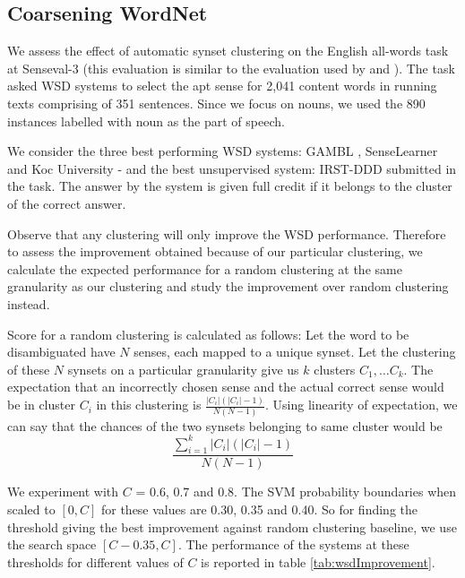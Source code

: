 \subsection{Coarsening WordNet}
We assess the effect of automatic synset clustering on the English all-words task at Senseval-3 \citep{Senseval3AllWordsTask} (this evaluation is similar to the evaluation used by \citep{Navigli06meaningfulclustering} and \citep{snow07mergesense}). The task asked WSD systems to select the apt sense for 2,041 content words in running texts comprising of 351 sentences. Since we focus on nouns, we used the 890 instances labelled with noun as the part of speech.

We consider the three best performing WSD systems: GAMBL \citep{decadt-EtAl:2004:Senseval-3}, SenseLearner \citep{mihalcea-faruque:2004:Senseval-3} and Koc University \citep{yuret:2004:Senseval-3} - and the best unsupervised system: IRST-DDD \citep{strapparava-gliozzo-giuliano:2004:Senseval-3} submitted in the task. The answer by the system is given full credit if it belongs to the cluster of the correct answer.

Observe that any clustering will only improve the WSD performance. Therefore to assess the improvement obtained because of our particular clustering, we calculate the expected performance for a random clustering at the same granularity as our clustering and study the improvement over random clustering instead. 

Score for a random clustering is calculated as follows: Let the word to be disambiguated have $N$ senses, each mapped to a unique synset. Let the clustering of these $N$ synsets on a particular granularity give us $k$ clusters $C_1,\ldots C_k$. The expectation that an incorrectly chosen sense and the actual correct sense would be in cluster $C_i$  in this clustering is $\frac{|C_i|(|C_i|-1)}{N(N-1)}$. Using linearity of expectation, we can say that the chances of the two synsets belonging to same cluster would be 
\begin{equation}
\frac{\sum_{i=1}^{k} |C_i|(|C_i|-1) }{N(N-1)}
\end{equation}

We experiment with $C$ = 0.6, 0.7 and 0.8. The SVM probability boundaries when scaled to $[0,C]$ for these values are 0.30, 0.35 and 0.40. So for finding the threshold giving the best improvement against random clustering baseline, we use the search space $[C-0.35, C]$. The performance of the systems at these thresholds for different values of $C$ is reported in %
table \ref{tab:wsdImprovement}.

